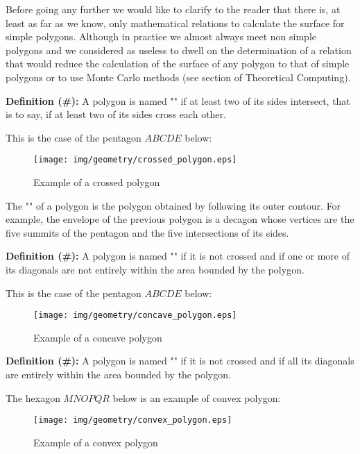 {Before going any further we would like to clarify to the reader that there is, at least as far as we know, only mathematical relations to calculate the surface for simple polygons. Although in practice we almost always meet non simple polygons and we considered as useless to dwell on the determination of a relation that would reduce the calculation of the surface of any polygon to that of simple polygons or to use Monte Carlo methods (see section of Theoretical Computing).

	\textbf{Definition (\#\mydef):} A polygon is named "" if at least two of its sides intersect, that is to say, if at least two of its sides cross each other. 

This is the case of the pentagon $ABCDE$ below:

\begin{figure}[H]
\centering
\texttt{[image: img/geometry/crossed\_polygon.eps]}
\caption{Example of a crossed polygon}
\end{figure}

	\begin{tcolorbox}[title=Remark,colframe=black,arc=10pt]
The "" of a polygon is the polygon obtained by following its outer contour. For example, the envelope of  the previous polygon is a decagon whose vertices are the five summits of the pentagon and the five intersections of its sides.
	\end{tcolorbox}	

	\textbf{Definition (\#\mydef):} A polygon is named "" if it is not crossed and if one or more of its diagonals are not entirely within the area bounded by the polygon.

This is the case of the pentagon $ABCDE$ below:

\begin{figure}[H]
\centering
\texttt{[image: img/geometry/concave\_polygon.eps]}
\caption{Example of a concave polygon}
\end{figure}

	\textbf{Definition (\#\mydef):} A polygon is named "" if it is not crossed and if all its diagonals are entirely within the area bounded by the polygon. 

The hexagon $MNOPQR$ below is an example of convex polygon:
\begin{figure}[H]
\centering
\texttt{[image: img/geometry/convex\_polygon.eps]}
\caption{Example of a convex polygon}
\end{figure}

}
